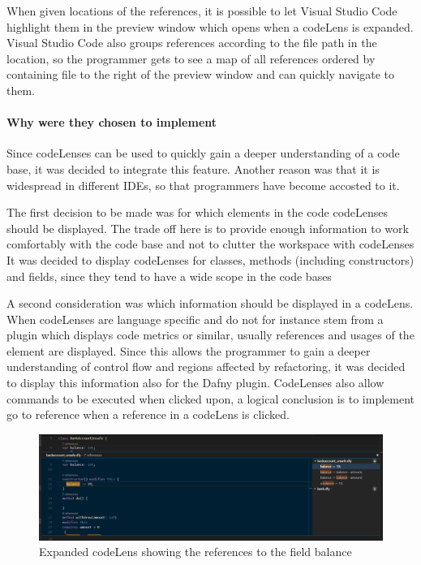 When given locations of the references, it is possible to let Visual Studio Code highlight them in the preview window which opens when a codeLens is expanded. Visual Studio Code also groups references according to the file path in the location, so the programmer gets to see a map of all references ordered by containing file to the right of the preview window and can quickly navigate to them.

\paragraph{Why were they chosen to implement}
Since codeLenses can be used to quickly gain a deeper understanding of a code base, it was decided to integrate this feature. Another reason was that it is widespread in different IDEs, so that programmers have become accosted to it. \newline

The first decision to be made was for which elements in the code codeLenses should be displayed. The trade off here is to  provide enough information to work comfortably with the code base and not to clutter the workspace with codeLenses It was decided to display codeLenses for classes, methods (including constructors) and fields, since they tend to have a wide scope in the code bases \newline

A second consideration was which information should be displayed in a codeLens. When codeLenses are language specific and do not for instance stem from a plugin which displays code metrics or similar, usually references and usages of the element are displayed. Since this allows the programmer to gain a deeper understanding of control flow and regions affected by refactoring, it was decided to display this information also for the Dafny plugin. CodeLenses also allow commands to be executed when clicked upon, a logical conclusion is to implement go to reference when a reference in a codeLens is clicked.\newline

\begin{figure}[H]
	\centering
	\includegraphics[width=1\textwidth]{img/codelensesExpanded}
	\caption{Expanded codeLens showing the references to the field balance}
	\label{fig:agcodelensesexpanded}
\end{figure}


